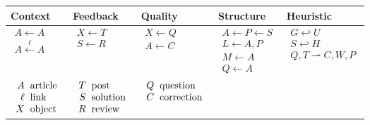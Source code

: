 \begin{center}
{\Tiny
\begin{tabular}{| >{\centering\arraybackslash}m{} | >{\centering\arraybackslash}m{} | >{\centering\arraybackslash}m{} | >{\centering\arraybackslash}m{} | >{\centering\arraybackslash}m{}| }
\hline
Context & Feedback & Quality & Structure & Heuristic \\[.2mm]
\hline
\vspace{.2mm}
$\begin{array}{c}
A \leftarrow A \\
A \xleftarrow{\ell} A
\end{array}$
&
$\begin{array}{c}
X \leftarrow T \\
S \leftarrow R
\end{array}$  &
$\begin{array}{c}
X \leftarrow Q \\
A \leftarrow C
\end{array}$ &
$\begin{array}{c}
A \leftarrow P
\leftarrow S \\
L \leftarrow A, P \\
M \leftarrow A \\
Q \leftarrow A
\end{array}$&
$\begin{array}{c}
G \hookleftarrow U \\
S\hookleftarrow H \\
Q,T\rightharpoonup C, W, P
\end{array}$ \\
\hline
$\begin{array}{r@{\hspace{2mm}}l}
A &\mathrm{article} \\
\ell &\mathrm{link} \\ 
X &\mathrm{object} 
\end{array}$  &
$\begin{array}{r@{\hspace{2mm}}l}
T &\mathrm{post} \\
S &\mathrm{solution} \\
R &\mathrm{review}
\end{array}$ &
$\begin{array}{r@{\hspace{2mm}}l}
Q &\mathrm{question} \\
C &\mathrm{correction}
\end{array}$

\end{tabular}}
\end{center}
